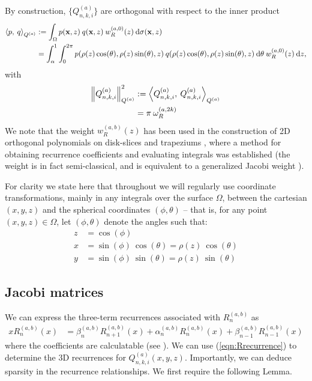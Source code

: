 \documentclass[11pt, oneside]{article}   	%
\newcommand{\genjac}{R}
\newcommand{\genjacw}{w_\genjac}
\newcommand{\normgenjac}{\omega_\genjac}
\newcommand{\scop}{Q}
\newcommand{\scopnki}{\scop_{n,k,i}}
\newcommand{\scopa}{\scop^{(a)}}
\newcommand{\scopnkia}{\scopnki^{(a)}}
\newcommand{\xvec}{\mathbf{x}}
\begin{document}
By construction, $\{\scopnkia\}$ are orthogonal with respect to the inner product
\begin{align}
	\ip< p, \: q >_{\scopa} &:= \int_\Omega p(\xvec, z) \: q(\xvec, z) \: \genjacw^{(a,0)}(z) \: \D \sigma(\xvec, z) \\
	&= \int_\alpha^1 \int_0^{2\pi} p(\rho(z) \cos(\theta), \rho(z) \sin(\theta), z) \: q(\rho(z) \cos(\theta), \rho(z) \sin(\theta), z) \: \D \theta \: \genjacw^{(a,0)}(z) \: \D z,
\end{align}
with
\begin{align}
	\norm{\scopnkia}_{\scopa}^2 &:= \ip< \scopnkia, \: \scopnkia >_{\scopa} \nonumber \\
	&= \pi \: \normgenjac^{(a, 2k)} \label{eqn:normscop}
\end{align}
We note that the weight $\genjacw^{(a,b)}(z)$ has been used in the construction of 2D orthogonal polynomials on disk-slices and trapeziums \cite{snowball2019sparse}, where a method for obtaining recurrence coefficients and evaluating integrals was established (the weight is in fact semi-classical, and is equivalent to a generalized Jacobi weight \cite[\S5]{magnus1995painleve}). 

For clarity we state here that throughout we will regularly use coordinate transformations, mainly in any integrals over the surface $\Omega$, between the cartesian $(x,y,z)$ and the spherical coordinates $(\phi, \theta)$ -- that is, for any point $(x,y,z) \in \Omega$, let $(\phi, \theta)$ denote the angles such that:
\begin{align*}
	z &= \cos(\phi) \\
	x &= \sin(\phi) \: \cos(\theta) = \rho(z) \: \cos(\theta) \\
	y &= \sin(\phi) \: \sin(\theta) = \rho(z) \: \sin(\theta)
\end{align*}


\subsection{Jacobi matrices}\label{subsection:jacobimats}

We can express the three-term recurrences associated with $\genjac_n^{(a,b)}$ as
\begin{align}
	x \genjac_n^{(a,b)}(x) &= \beta_n^{(a,b)} \genjac_{n+1}^{(a,b)}(x) + \alpha_n^{(a,b)} \genjac_n^{(a,b)}(x) + \beta_{n-1}^{(a,b)} \genjac_{n-1}^{(a,b)}(x) \label{eqn:Rrecurrence}
\end{align}
where the coefficients are calculatable (see \cite{snowball2019sparse}). We can use (\ref{eqn:Rrecurrence}) to determine the 3D recurrences for $\scopnkia(x,y,z)$. Importantly, we can deduce sparsity in the recurrence relationships.  We first require the following Lemma.
\end{document}
